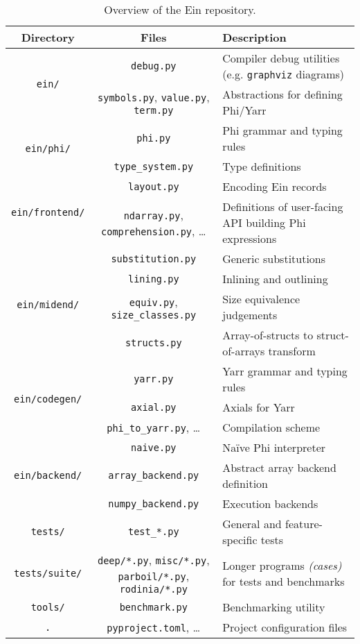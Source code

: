 \begin{table}[h]
    \centering
    \begin{tabular}{c|c|l}
        Directory & Files & Description \\ \hline \hline
        \multirow{2}{*}{\texttt{ein/}} 
        & \texttt{debug.py} & Compiler debug utilities (e.g. \texttt{graphviz} diagrams) \\
        & \texttt{symbols.py}, \texttt{value.py}, \texttt{term.py} & Abstractions for defining Phi/Yarr \\ \hline
        \multirow{2}{*}{\texttt{ein/phi/}} & \texttt{phi.py} & Phi grammar and typing rules \\ 
        & \texttt{type\_system.py} & Type definitions \\ \hline
        \multirow{2}{*}{\texttt{ein/frontend/}} & \texttt{layout.py} & Encoding Ein records \\ 
        & \texttt{ndarray.py}, \texttt{comprehension.py}, \dots & Definitions of user-facing API building Phi expressions \\ \hline
       \multirow{4}{*}{\texttt{ein/midend/}}       
        & \texttt{substitution.py} & Generic substitutions \\ 
        & \texttt{lining.py} & Inlining and outlining \\ 
        & \texttt{equiv.py}, \texttt{size\_classes.py} & Size equivalence judgements \\ 
        & \texttt{structs.py} & Array-of-structs to struct-of-arrays transform \\ \hline
       \multirow{3}{*}{\texttt{ein/codegen/}}       
        & \texttt{yarr.py} & Yarr grammar and typing rules \\ 
        & \texttt{axial.py} & Axials for Yarr \\ 
        & \texttt{phi\_to\_yarr.py}, \dots & Compilation scheme \\ \hline
       \multirow{3}{*}{\texttt{ein/backend/}}       
        & \texttt{naive.py} & Na\"ive Phi interpreter \\ 
        & \texttt{array\_backend.py} & Abstract array backend definition \\
        & \texttt{numpy\_backend.py} & Execution backends \\ \hline
       \texttt{tests/}       
        & \texttt{test\_*.py} & General and feature-specific tests \\ \hline 
       \texttt{tests/suite/}       
        & \makecell{\texttt{deep/*.py}, \texttt{misc/*.py}, \\ \texttt{parboil/*.py}, \texttt{rodinia/*.py}} & Longer programs \textit{(cases)} for tests and benchmarks \\ \hline 
       \texttt{tools/}
        & \texttt{benchmark.py} & Benchmarking utility \\ \hline 
        \texttt{.} & \texttt{pyproject.toml}, \dots & Project configuration files
    \end{tabular}
    \caption{Overview of the Ein repository.}
    \label{tab:repository}
\end{table}
